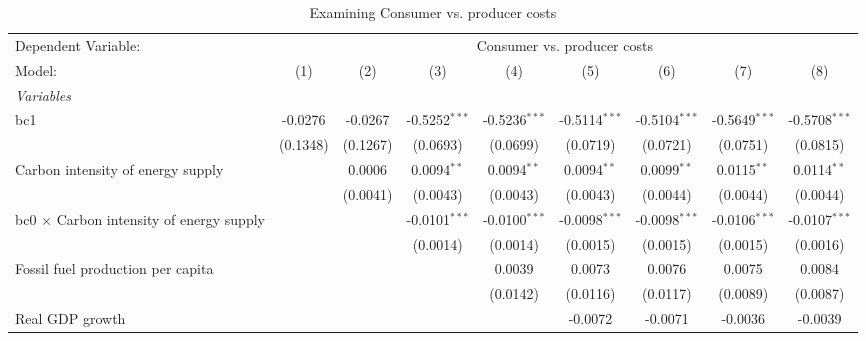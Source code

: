 
\begin{table}[htbp]
   \caption{Examining Consumer vs. producer costs}
   \centering
   \begin{tabular}{lcccccccc}
      \tabularnewline \midrule \midrule
      Dependent Variable: & \multicolumn{8}{c}{Consumer vs. producer costs}\\
      Model:                                          & (1)      & (2)      & (3)             & (4)             & (5)             & (6)             & (7)             & (8)\\  
      \midrule
      \emph{Variables}\\
      bc1                                             & -0.0276  & -0.0267  & -0.5252$^{***}$ & -0.5236$^{***}$ & -0.5114$^{***}$ & -0.5104$^{***}$ & -0.5649$^{***}$ & -0.5708$^{***}$\\   
                                                      & (0.1348) & (0.1267) & (0.0693)        & (0.0699)        & (0.0719)        & (0.0721)        & (0.0751)        & (0.0815)\\   
      Carbon intensity of energy supply               &          & 0.0006   & 0.0094$^{**}$   & 0.0094$^{**}$   & 0.0094$^{**}$   & 0.0099$^{**}$   & 0.0115$^{**}$   & 0.0114$^{**}$\\   
                                                      &          & (0.0041) & (0.0043)        & (0.0043)        & (0.0043)        & (0.0044)        & (0.0044)        & (0.0044)\\   
      bc0 $\times$ Carbon intensity of energy supply  &          &          & -0.0101$^{***}$ & -0.0100$^{***}$ & -0.0098$^{***}$ & -0.0098$^{***}$ & -0.0106$^{***}$ & -0.0107$^{***}$\\   
                                                      &          &          & (0.0014)        & (0.0014)        & (0.0015)        & (0.0015)        & (0.0015)        & (0.0016)\\   
      Fossil fuel production per capita               &          &          &                 & 0.0039          & 0.0073          & 0.0076          & 0.0075          & 0.0084\\   
                                                      &          &          &                 & (0.0142)        & (0.0116)        & (0.0117)        & (0.0089)        & (0.0087)\\   
      Real GDP growth                                 &          &          &                 &                 & -0.0072         & -0.0071         & -0.0036         & -0.0039\\   

\end{tabular}
\end{table}
